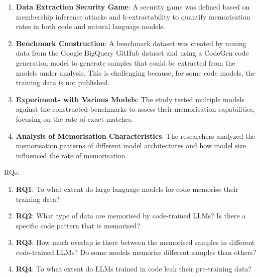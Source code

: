 \begin{tcolorbox}[title=Approach, colback=white, colframe=black, sharp corners=southwest, boxrule=0.8mm]

\begin{enumerate}
    \item \textbf{Data Extraction Security Game}: A security game was defined based on membership inference attacks and k-extractability to quantify memorisation rates in both code and natural language models.
    
    \item \textbf{Benchmark Construction}: A benchmark dataset was created by mining data from the Google BigQuery GitHub dataset and using a CodeGen code generation model to generate samples that could be extracted from the models under analysis. This is challenging because, for some code models, the training data is not published.
    
    \item \textbf{Experiments with Various Models}: The study tested multiple models against the constructed benchmarks to assess their memorisation capabilities, focusing on the rate of exact matches.
    
    \item \textbf{Analysis of Memorisation Characteristics}: The researchers analyzed the memorisation patterns of different model architectures and how model size influenced the rate of memorisation.
\end{enumerate}


RQs:

\begin{enumerate}
    \item \textbf{RQ1}: To what extent do large language models for code memorise their training data?
    
    \item \textbf{RQ2}: What type of data are memorised by code-trained LLMs? Is there a specific code pattern that is memorised?
    
    \item \textbf{RQ3}: How much overlap is there between the memorised samples in different code-trained LLMs? Do some models memorise different samples than others?
    
    \item \textbf{RQ4}: To what extent do LLMs trained in code leak their pre-training data?
\end{enumerate}
\end{tcolorbox}

